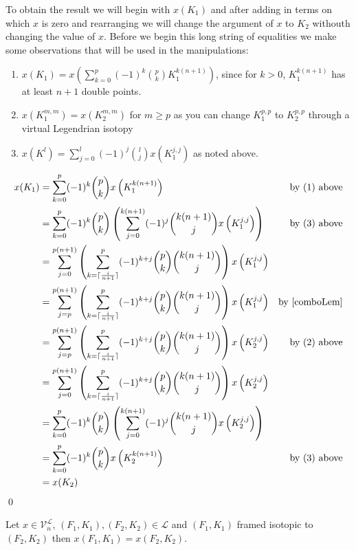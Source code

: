 To obtain the result we will begin with $x(K_1)$ and after adding in terms on which $x$ is zero and rearranging we will change the argument of $x$ to $K_2$ withouth changing the value of $x$.  Before we begin this long string of equalities we make some observations that will be used in the manipulations:
\begin{enumerate} 
\item $x(K_1) = x(\sum_{k=0}^p(-1)^k\binom{p}{k}K_1^{k(n+1)})$, since for $k>0$, $K_1^{k(n+1)}$ has at least $n+1$ double points.  
\item $x(K_1^{m,m}) = x(K_2^{m,m})$ for $m\geq p$ as you can change $K_1^{p,p}$ to $K_2^{p,p}$ through a virtual Legendrian isotopy
\item $x(K^l) = \sum_{j=0}^{l}(-1)^j\binom{l}{j}x\left(K_1^{j,j}\right)$ as noted above.
\end{enumerate}

\begin{align*}
x(K_1) &= \sum_{k=0}^p(-1)^k\binom{p}{k} x\left( K_1^{k(n+1)}\right)& \text{by (1) above}\\
&= \sum_{k=0}^p(-1)^k\binom{p}{k}\left(\sum_{j=0}^{k(n+1)}(-1)^j\binom{k(n+1)}{j}x\left(K_1^{j,j}\right)\right)& \text{by (3) above}\\
&= \sum_{j=0}^{p(n+1)} \left( \sum_{k=\lceil\frac{i}{n+1}\rceil}^p (-1)^{k+j}\binom{p}{k}\binom{k(n+1)}{j} \right) x\left(K_1^{j,j}\right)&\\
&= \sum_{j=p}^{p(n+1)} \left( \sum_{k=\lceil\frac{i}{n+1}\rceil}^p (-1)^{k+j}\binom{p}{k}\binom{k(n+1)}{j} \right) x\left(K_1^{j,j}\right)& \text{by } \ref{comboLem}\\
&= \sum_{j=p}^{p(n+1)} \left( \sum_{k=\lceil\frac{i}{n+1}\rceil}^p (-1)^{k+j}\binom{p}{k}\binom{k(n+1)}{j} \right) x\left(K_2^{j,j}\right)& \text{by  (2) above} \\
&= \sum_{j=0}^{p(n+1)} \left( \sum_{k=\lceil\frac{i}{n+1}\rceil}^p (-1)^{k+j}\binom{p}{k}\binom{k(n+1)}{j} \right) x\left(K_2^{j,j}\right)&\\
&= \sum_{k=0}^p(-1)^k\binom{p}{k}\left(\sum_{j=0}^{k(n+1)}(-1)^j\binom{k(n+1)}{j}x\left(K_2^{j,j}\right)\right)&\\
&= \sum_{k=0}^p(-1)^k\binom{p}{k}x\left(K_2^{k(n+1)}\right)&\text{by (3) above}\\
&= x(K_2)
\end{align*} 
\qed


\begin{thm}
Let $x\in \mathcal{V}_n^\mathcal{L}$, $(F_1, K_1), (F_2, K_2) \in \mathcal{L}$ and $(F_1, K_1)$ framed isotopic to $(F_2, K_2)$ then $x(F_1, K_1) = x(F_2, K_2)$.
\end{thm}
